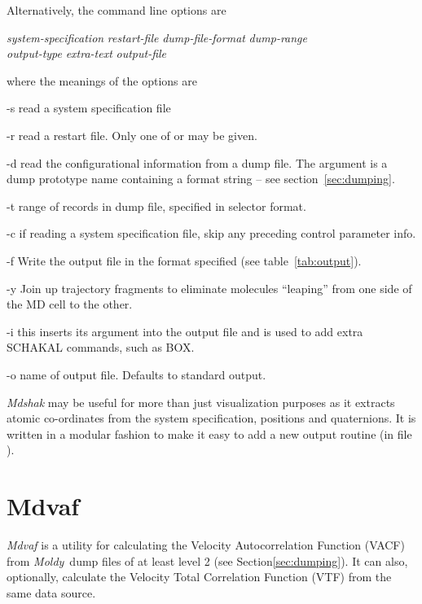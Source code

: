 \documentclass[a4paper,twoside]{report}
\newcommand{\moldy}{\emph{Moldy}}
\begin{document}
Alternatively, the command line options are
\begin{center}
\Lit{[-s} \textit{system-specification} \Lit{|}
 \textit{restart-file}\Lit{]}
\Lit{[-d} \textit{dump-file-format}\Lit{]}
\Lit{[-t} \textit{dump-range}\Lit{]} \\
\Lit{[-c]}
\Lit{[-f} \textit{output-type}\Lit{]}
\Lit{[-y]}
\Lit{[-i} \textit{extra-text}\Lit{]}
\Lit{[-o} \textit{output-file}\Lit{]}
\end{center}
where the meanings of the options are
\begin{Argdescription}
\item[-s] read a system specification file
\item[-r] read a restart file.  Only one of  or  may
be given.
\item[-d] read the configurational information from a dump file.  The
argument is a dump prototype name containing a  format
string -- see section~\ref{sec:dumping}.
\item[-t] range of records in dump file, specified in selector
format.
\item[-c] if reading a system specification file, skip any preceding
control parameter info.
\item[-f] Write the output file in the format specified (see table~\ref{tab:output}).
\item[-y] Join up trajectory fragments to eliminate molecules ``leaping''
  from one side of the MD cell to the other.
\item[-i]   this inserts its argument into the output file and is used
to add extra SCHAKAL commands, such as BOX.
\item[-o] name of output file. Defaults to standard output.
\end{Argdescription}

\emph{Mdshak} may be useful for more than just visualization purposes
as it extracts atomic co-ordinates from the system specification,
positions and quaternions.  It is written in a modular fashion
to make it easy to add a new output routine (in file ).

\section{Mdvaf}%
\emph{Mdvaf} is a utility for calculating the Velocity Autocorrelation 
Function (VACF) from \moldy\ dump files of at least level 2 (see 
Section\ref{sec:dumping}). It can also, optionally, calculate the Velocity 
Total Correlation Function (VTF) from the same data source.
\end{document}
